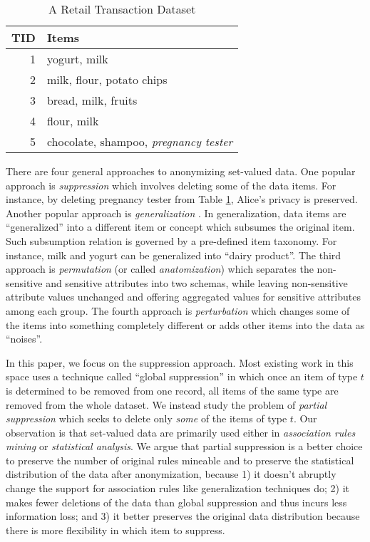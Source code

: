 \begin{table}[th]
\centering
\caption{A Retail Transaction Dataset}\label{tab:retail-ex}

\begin{tabular}{|r|l|} \hline
{\bf TID} & {\bf Items} \\ \hline \hline
1 & yogurt, milk \\ \hline
2 & milk, flour, potato chips \\ \hline
3 & bread, milk, fruits \\ \hline
4 & flour, milk \\ \hline
5 & chocolate, shampoo, {\em pregnancy tester} \\ \hline
\end{tabular}
\end{table}

There are four general approaches to anonymizing set-valued data.
One popular approach is {\em suppression} \cite{Xu:2008:ATD,Cao:2010:rho}
which involves deleting some of the data items.
For instance, by deleting pregnancy tester from Table \ref{tab:retail-ex}, 
Alice's privacy is preserved. Another popular approach is {\em generalization}
\cite{Cao:2010:rho}. In generalization, data items are ``generalized'' into a
different item or concept which subsumes the original item. Such subsumption
relation is governed by a pre-defined item taxonomy.
For instance, milk and yogurt can be generalized into ``dairy product''.
The third approach is {\em permutation} (or called {\em anatomization})
\cite{Xiao:2006:Anatomy,2011:TKDE:Anonymous} which separates the non-sensitive
and sensitive attributes into two schemas, while leaving non-sensitive
attribute values unchanged and offering aggregated values for sensitive
attributes among each group. The fourth approach is {\em perturbation} 
\cite{ChenMFDX11:Diff} which changes some of the items into
something completely different or adds other items into the data as ``noises''.

In this paper, we focus on the suppression approach. 
Most existing work in this space uses a technique called ``global
suppression'' \cite{Cao:2010:rho} in which once an item of type $t$ is
determined to be removed from one record, all items of the same type are
removed from the whole dataset. We instead study the problem of {\em partial
suppression} which seeks to delete only {\em some} of the items of type $t$.
Our observation is that set-valued data are primarily used either in
{\em association rules mining} or {\em statistical analysis}. We
argue that partial suppression is a better choice to preserve the 
number of original rules mineable and to preserve the statistical 
distribution of the data after anonymization,
because 1) it doesn't abruptly change the support for association rules like
generalization techniques do; 2) it makes fewer deletions of the data than
global suppression and thus incurs less information loss;
and 3) it better preserves the original data distribution because there is more 
flexibility in which item to suppress.

